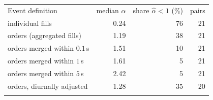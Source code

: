 \begin{tabular}{@{}lrrr@{}}
\toprule
Event definition & median $\hat\alpha$ & share $\hat\alpha<1$ (\%) & pairs \\
\colrule
individual fills & 0.24 & 76 & 21 \\
orders (aggregated fills) & 1.19 & 38 & 21 \\
orders merged within $0.1$\,s & 1.51 & 10 & 21 \\
orders merged within $1$\,s & 1.61 & 5 & 21 \\
orders merged within $5$\,s & 2.42 & 5 & 21 \\
orders, diurnally adjusted & 1.28 & 35 & 20 \\
\botrule
\end{tabular}